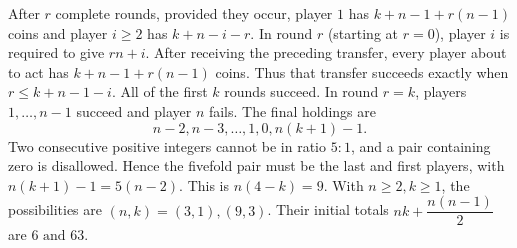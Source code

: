 After $r$ complete rounds, provided they occur, player $1$ has $k+n-1+r(n-1)$ coins and player $i\ge2$ has $k+n-i-r$. In round $r$ (starting at $r=0$), player $i$ is required to give $rn+i$. After receiving the preceding transfer, every player about to act has $k+n-1+r(n-1)$ coins. Thus that transfer succeeds exactly when $r\le k+n-1-i$. All of the first $k$ rounds succeed. In round $r=k$, players $1,\ldots,n-1$ succeed and player $n$ fails. The final holdings are\[n-2,n-3,\ldots,1,0,n(k+1)-1.\]Two consecutive positive integers cannot be in ratio $5:1$, and a pair containing zero is disallowed. Hence the fivefold pair must be the last and first players, with $n(k+1)-1=5(n-2)$. This is $n(4-k)=9$. With $n\ge2,k\ge1$, the possibilities are $(n,k)=(3,1),(9,3)$. Their initial totals $nk+\dfrac{n(n-1)}{2}$ are $\boxed{6\text{ and }63}$.
